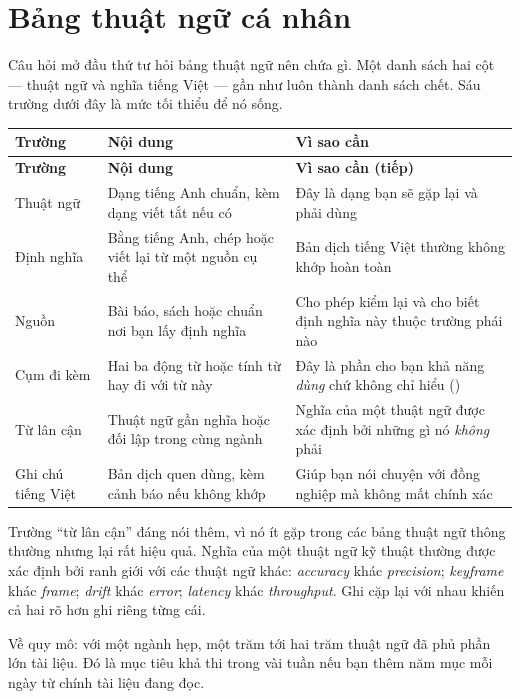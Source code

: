 \documentclass[../../english.tex]{subfiles}
\begin{document}
\section{Bảng thuật ngữ cá nhân}

Câu hỏi mở đầu thứ tư hỏi bảng thuật ngữ nên chứa gì. Một danh sách hai cột --- thuật ngữ và nghĩa tiếng Việt --- gần như luôn thành danh sách chết. Sáu trường dưới đây là mức tối thiểu để nó sống.

\begin{center}\footnotesize
{}
\begin{longtable}{@{}L{3.2cm}L{5.0cm}L{6.2cm}@{}}
\toprule
\textbf{Trường} & \textbf{Nội dung} & \textbf{Vì sao cần}\\
\midrule
\endfirsthead
\toprule
\textbf{Trường} & \textbf{Nội dung} & \textbf{Vì sao cần (tiếp)}\\
\midrule
\endhead
Thuật ngữ & Dạng tiếng Anh chuẩn, kèm dạng viết tắt nếu có & Đây là dạng bạn sẽ gặp lại và phải dùng\\
Định nghĩa & Bằng tiếng Anh, chép hoặc viết lại từ một nguồn cụ thể & Bản dịch tiếng Việt thường không khớp hoàn toàn\\
Nguồn & Bài báo, sách hoặc chuẩn nơi bạn lấy định nghĩa & Cho phép kiểm lại và cho biết định nghĩa này thuộc trường phái nào\\
Cụm đi kèm & Hai ba động từ hoặc tính từ hay đi với từ này & Đây là phần cho bạn khả năng \emph{dùng} chứ không chỉ hiểu ()\\
Từ lân cận & Thuật ngữ gần nghĩa hoặc đối lập trong cùng ngành & Nghĩa của một thuật ngữ được xác định bởi những gì nó \emph{không} phải\\
Ghi chú tiếng Việt & Bản dịch quen dùng, kèm cảnh báo nếu không khớp & Giúp bạn nói chuyện với đồng nghiệp mà không mất chính xác\\
\bottomrule
\end{longtable}
\end{center}

Trường ``từ lân cận'' đáng nói thêm, vì nó ít gặp trong các bảng thuật ngữ thông thường nhưng lại rất hiệu quả. Nghĩa của một thuật ngữ kỹ thuật thường được xác định bởi ranh giới với các thuật ngữ khác: \emph{accuracy} khác \emph{precision}; \emph{keyframe} khác \emph{frame}; \emph{drift} khác \emph{error}; \emph{latency} khác \emph{throughput}. Ghi cặp lại với nhau khiến cả hai rõ hơn ghi riêng từng cái.

Về quy mô: với một ngành hẹp, một trăm tới hai trăm thuật ngữ đã phủ phần lớn tài liệu. Đó là mục tiêu khả thi trong vài tuần nếu bạn thêm năm mục mỗi ngày từ chính tài liệu đang đọc.
\end{document}
